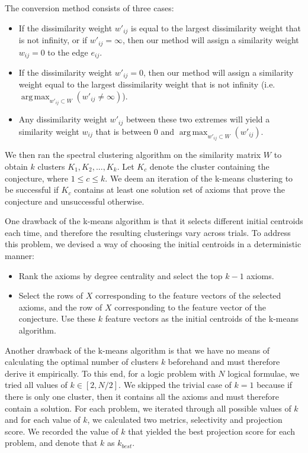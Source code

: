 \documentclass[EPiC]{easychair}
\DeclareMathOperator*{\argmaxA}{arg\,max} %
\begin{document}
The conversion method consists of three cases:
\begin{itemize}
\item If the dissimilarity weight $w'_{ij}$ is equal to the largest 
dissimilarity weight that is not infinity, or if $w'_{ij} = \infty$, then 
our method will assign a similarity weight $w_{ij} = 0$ to the edge $e_{ij}$.

\item If the dissimilarity weight $w'_{ij} = 0$, then our method will assign 
a similarity weight equal to the largest dissimilarity weight that is not 
infinity (i.e. $\argmaxA_{w'_{ij} \subset W} (w'_{ij} \neq \infty)$).

\item Any dissimilarity weight $w'_{ij}$ between these two extremes will 
yield a similarity weight $w_{ij}$ that is between 
$0$ and $\argmaxA_{w'_{ij} \subset W} (w'_{ij})$.
\end{itemize}

We then ran the spectral clustering algorithm on the similarity matrix $W$ 
to obtain $k$ clusters $K_{1}, K_{2}, ..., K_{k}$. Let $K_{c}$ denote the 
cluster containing the conjecture, where $1 \leq c \leq k$. We deem an
iteration of the k-means clustering to be successful if $K_{c}$ contains at 
least one solution set of axioms that prove the conjecture and unsuccessful 
otherwise.

One drawback of the k-means algorithm is that it selects different initial 
centroids each time, and therefore the resulting clusterings vary across 
trials. To address this problem, we devised a way of choosing the initial 
centroids in a deterministic manner:
\begin{itemize}
\item Rank the axioms by degree centrality and select the top $k-1$ axioms.
\item Select the rows of $X$ corresponding to the feature vectors of the
selected axioms, and the row of $X$ corresponding to the feature vector of 
the conjecture. Use these $k$ feature vectors as the initial centroids of 
the k-means algorithm. 
\end{itemize}

Another drawback of the k-means algorithm is that we have no means of 
calculating the optimal number of clusters $k$ beforehand and must therefore 
derive it empirically. To this end, for a logic problem with $N$ logical 
formulae, we tried all values of $k \in [2, N/2]$. We skipped the trivial 
case of $k=1$ because if there is only one cluster, then it contains all the 
axioms and must therefore contain a solution. For each problem, we iterated
through all possible values of $k$ and for each value of $k$, we calculated 
two metrics, selectivity and projection score. We recorded the value of $k$
that yielded the best projection score for each problem, and denote that 
$k$ as $k_{best}$. 
\end{document}
